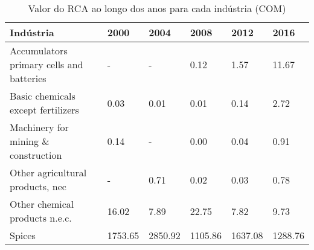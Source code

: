 \begin{table}
\centering
\caption{Valor do RCA ao longo dos anos para cada indústria (COM)}
\begin{tabular}{p{6cm}p{1.5cm}p{1.5cm}p{1.5cm}p{1.5cm}p{1.5cm}}
\toprule
                               Indústria &    2000 &    2004 &    2008 &    2012 &    2016 \\
\midrule
Accumulators primary cells and batteries &       - &       - &    0.12 &    1.57 &   11.67 \\
      Basic chemicals except fertilizers &    0.03 &    0.01 &    0.01 &    0.14 &    2.72 \\
     Machinery for mining \& construction &    0.14 &       - &    0.00 &    0.04 &    0.91 \\
        Other agricultural products, nec &       - &    0.71 &    0.02 &    0.03 &    0.78 \\
          Other chemical products n.e.c. &   16.02 &    7.89 &   22.75 &    7.82 &    9.73 \\
                                  Spices & 1753.65 & 2850.92 & 1105.86 & 1637.08 & 1288.76 \\
\bottomrule
\end{tabular}
\end{table}
